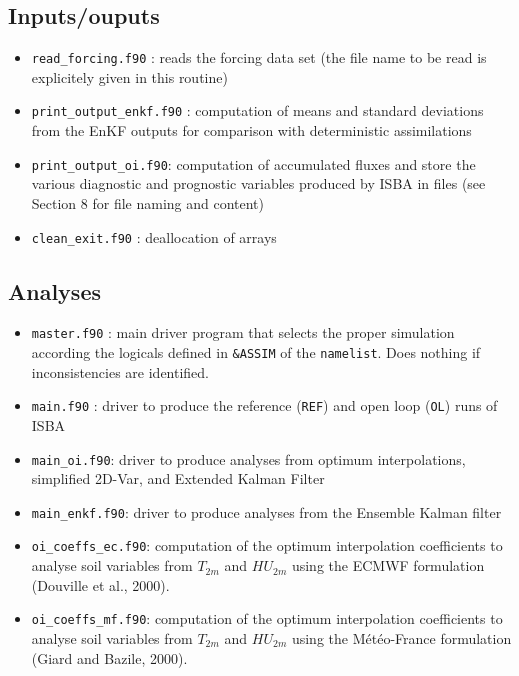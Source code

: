 \documentclass[12pt]{article}
\begin{document}
\subsection{Inputs/ouputs}
\begin{itemize}
\item {\tt read\_forcing.f90} : reads the forcing data set (the file name to be read is
explicitely given in this routine)
\item {\tt print\_output\_enkf.f90} : computation of means and standard deviations from the EnKF
outputs for comparison with deterministic assimilations
\item {\tt print\_output\_oi.f90}: computation of accumulated fluxes and store the various
diagnostic and prognostic variables produced by ISBA in files (see Section 8 for file naming
and content)
\item {\tt clean\_exit.f90} : deallocation of arrays
\end{itemize}
\subsection{Analyses}
\begin{itemize}
\item {\tt master.f90} : main driver program that selects the proper simulation
according the logicals defined in {\tt \&ASSIM} of the {\tt namelist}. Does nothing
if inconsistencies are identified.
\item {\tt main.f90} :  driver to produce the reference ({\tt REF}) and open loop ({\tt OL}) runs of ISBA
\item {\tt main\_oi.f90}: driver to produce analyses from optimum interpolations, simplified
2D-Var, and Extended Kalman Filter
\item {\tt main\_enkf.f90}: driver to produce analyses from the Ensemble Kalman filter
\item {\tt oi\_coeffs\_ec.f90}: computation of the optimum interpolation coefficients to
analyse soil variables from $T_{2m}$ and $HU_{2m}$ using the ECMWF formulation (Douville et al., 2000).
\item {\tt oi\_coeffs\_mf.f90}: computation of the optimum interpolation coefficients to
analyse soil variables from $T_{2m}$ and $HU_{2m}$ using the M\'et\'eo-France formulation (Giard and Bazile, 2000).
\end{itemize}
\end{document}
